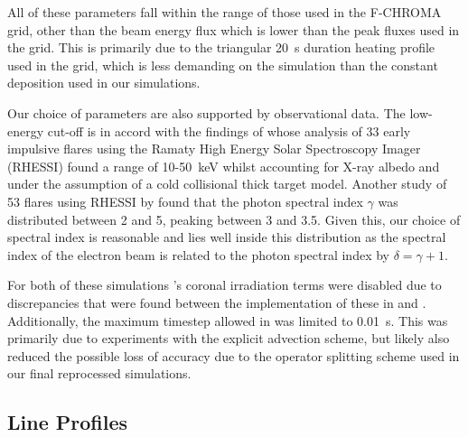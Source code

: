 All of these parameters fall within the range of those used in the F-CHROMA grid, other than the beam energy flux which is lower than the peak fluxes used in the grid.
This is primarily due to the triangular \SI{20}{\second} duration heating profile used in the grid, which is less demanding on the simulation than the constant deposition used in our simulations.

Our choice of parameters are also supported by observational data.
The low-energy cut-off is in accord with the findings of \citet{Sui2007} whose analysis of 33 early impulsive flares using the Ramaty High Energy Solar Spectroscopy Imager (RHESSI) found a range of 10-\SI{50}{\kilo\electronvolt} whilst accounting for X-ray albedo and under the assumption of a cold collisional thick target model.
Another study of 53 flares using RHESSI by \citet{Saint-Hilaire2008} found that the photon spectral index $\gamma$ was distributed between 2 and 5, peaking between 3 and 3.5.
Given this, our choice of spectral index is reasonable and lies well inside this distribution as the spectral index of the electron beam is related to the photon spectral index by $\delta = \gamma + 1$.

For both of these simulations \Radyn{}'s coronal irradiation terms were disabled due to discrepancies that were found between the implementation of these in \Radyn{} and \Lw{}.
Additionally, the maximum timestep allowed in \Radyn{} was limited to \SI{0.01}{\second}.
This was primarily due to experiments with the explicit advection scheme, but likely also reduced the possible loss of accuracy due to the operator splitting scheme used in our final reprocessed simulations.

\subsection{Line Profiles}\label{Sec:TimeDep8542Profiles}

